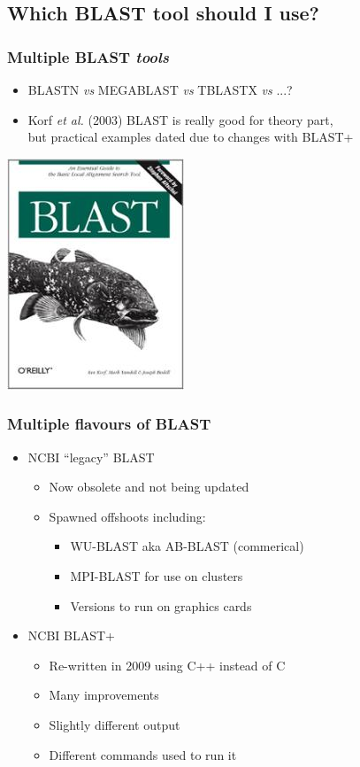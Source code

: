 %

\subsection{Which BLAST tool should I use?}
\begin{frame}
  \frametitle{Multiple BLAST \textit{tools}}
  \begin{itemize}
    \item BLASTN \textit{vs} MEGABLAST \textit{vs} TBLASTX \textit{vs} ...?
    \item Korf \textit{et al.} (2003) BLAST is really good for theory part, \\
             but practical examples dated due to changes with BLAST+
  \end{itemize}
  \begin{center}
    \includegraphics[width=.2\textwidth]{images/korf_book}
  \end{center}
\end{frame}

\begin{frame}
  \frametitle{Multiple flavours of BLAST}
  \begin{itemize}
    \item NCBI ``legacy'' BLAST
    \begin{itemize}
      \item Now obsolete and not being updated
      \item Spawned offshoots including:
      \begin{itemize}
         \item WU-BLAST aka AB-BLAST (commerical)
         \item MPI-BLAST for use on clusters
         \item Versions to run on graphics cards
      \end{itemize}
    \end{itemize}
    \item NCBI BLAST+
    \begin{itemize}
      \item Re-written in 2009 using C++ instead of C
      \item Many improvements
      \item Slightly different output
      \item Different commands used to run it
    \end{itemize}
  \end{itemize}
\end{frame}

